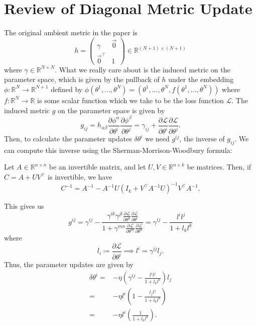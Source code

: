 \documentclass{article}
\newcommand{\loss}{\mathcal{L}}
\begin{document}
\section{Review of Diagonal Metric Update}
The original ambient metric in the paper is $$
    h = \begin{pmatrix} \gamma & \vec{0} \\ \vec{0}^\top & 1 \end{pmatrix}\in\mathbb{R}^{(N+1)\times(N+1)}
$$ where $\gamma\in\mathbb{R}^{N\times N}$.
What we really care about is the induced metric on the parameter space, which is given by the pullback of $h$ under the embedding 
$\phi:\mathbb{R}^N\to\mathbb{R}^{N+1}$ defined by 
$\phi(\theta^1,\ldots,\theta^N) = (\theta^1,\ldots,\theta^N,f(\theta^1,\ldots,\theta^N))$ 
where $f:\mathbb{R}^N\to\mathbb{R}$ is some scalar function which we take to be the loss function $\loss$.
The induced metric $g$ on the parameter space is given by $$ 
    g_{ij} 
    = h_{\alpha\beta} \frac{\partial \phi^\alpha}{\partial \theta^i} \frac{\partial \phi^\beta}{\partial \theta^j} 
    = \gamma_{ij} + \frac{\partial \loss}{\partial \theta^i} \frac{\partial \loss}{\partial \theta^j}.
$$ Then, to calculate the parameter updates $\delta \theta^i$ we need $g^{ij}$, the inverse of $g_{ij}$.
We can compute this inverse using the Sherman-Morrison-Woodbury formula:
\begin{tcolorbox}[colback=gray!8, colframe=gray!22, breakable, title=\textbf{Sherman-Morrison-Woodbury Formula}, coltitle=black]
    Let $A\in\mathbb{R}^{n\times n}$ be an invertible matrix, and let $U,V\in\mathbb{R}^{n\times k}$ be matrices. 
    Then, if $C = A + U V^\top$ is invertible, we have $$C^{-1} = A^{-1} - A^{-1} U (I_k + V^\top A^{-1} U)^{-1} V^\top A^{-1}.$$
\end{tcolorbox}
\noindent This gives us $$ 
    g^{ij} 
    = \gamma^{ij} - \frac{\gamma^{ik}\gamma^{jl} \frac{\partial \loss}{\partial \theta^k} \frac{\partial \loss}{\partial \theta^l}}{1 + \gamma^{mn} \frac{\partial \loss}{\partial \theta^m} \frac{\partial \loss}{\partial \theta^n}}
    = \gamma^{ij} - \frac{l^i l^j}{1+l_k l^k} 
$$ where $$
    l_i \coloneqq \frac{\partial\loss}{\partial \theta^i} \implies l^i = \gamma^{ij} l_j.
$$ Thus, the parameter updates are given by
\begin{align*}
    \delta \theta^i =& -\eta \left( \gamma^{ij} - \frac{l^i l^j}{1+l_k l^k} \right) l_j \\
    =& -\eta l^i \left( 1 - \frac{l_j l^j}{1+l_k l^k} \right) \\
    =& -\eta l^i \left( \frac{1}{1+l_k l^k} \right).
\end{align*}
\end{document}
